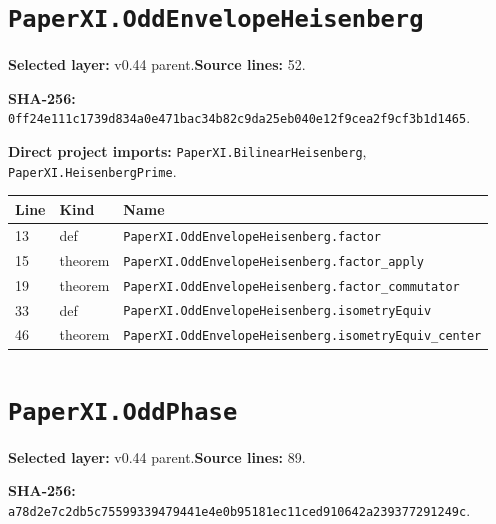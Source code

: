 \documentclass[10pt,oneside]{book}
\begin{document}
\section{\texorpdfstring{\nolinkurl{PaperXI.OddEnvelopeHeisenberg}}{PaperXI.OddEnvelopeHeisenberg}}\label{module:PaperXI.OddEnvelopeHeisenberg}

\textbf{Selected layer:} v0.44 parent.\quad\textbf{Source lines:} 52.\par\textbf{SHA-256:} {\scriptsize\nolinkurl{0ff24e111c1739d834a0e471bac34b82c9da25eb040e12f9cea2f9cf3b1d1465}}.


\textbf{Direct project imports:} \nolinkurl{PaperXI.BilinearHeisenberg}, \nolinkurl{PaperXI.HeisenbergPrime}.

\begin{longtable}{@{}p{}p{}p{}@{}}\toprule Line&Kind&Name\\\midrule\endhead

13&def&\nolinkurl{PaperXI.OddEnvelopeHeisenberg.factor}\\

15&theorem&\nolinkurl{PaperXI.OddEnvelopeHeisenberg.factor_apply}\\

19&theorem&\nolinkurl{PaperXI.OddEnvelopeHeisenberg.factor_commutator}\\

33&def&\nolinkurl{PaperXI.OddEnvelopeHeisenberg.isometryEquiv}\\

46&theorem&\nolinkurl{PaperXI.OddEnvelopeHeisenberg.isometryEquiv_center}\\

\bottomrule\end{longtable}

\section{\texorpdfstring{\nolinkurl{PaperXI.OddPhase}}{PaperXI.OddPhase}}\label{module:PaperXI.OddPhase}

\textbf{Selected layer:} v0.44 parent.\quad\textbf{Source lines:} 89.\par\textbf{SHA-256:} {\scriptsize\nolinkurl{a78d2e7c2db5c75599339479441e4e0b95181ec11ced910642a239377291249c}}.

\end{document}
